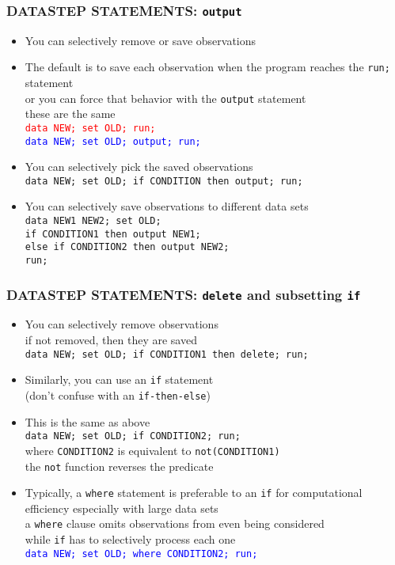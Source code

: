 \documentclass[11pt,pdftex,dvipsnames,usenames,helvetica]{beamer}
\begin{document}
\begin{frame}[fragile]
\frametitle{DATASTEP STATEMENTS: {\tt output}}
\begin{itemize}
\item You can selectively remove or save observations
\item The default is to save each observation when the program
reaches the {\tt run;} statement\\
or you can force that behavior with the {\tt output} statement\\
these are the same\\
\textcolor{red}{\tt data NEW; set OLD; run;}\\
\textcolor{blue}{\tt data NEW; set OLD; output; run;}
\item You can selectively pick the saved observations\\
{\tt data NEW; set OLD; if CONDITION then output; run;}
\item You can selectively save observations to different data sets\\
{\tt data NEW1 NEW2; set OLD;\\
 if CONDITION1 then output NEW1;\\
 else if CONDITION2 then output NEW2;\\
 run;}
\end{itemize}
\end{frame}

\begin{frame}[fragile]
\frametitle{DATASTEP STATEMENTS: {\tt delete} and subsetting {\tt if}}
\begin{itemize}
\item You can selectively remove observations\\
if not removed, then they are saved\\
{\tt data NEW; set OLD; if CONDITION1 then delete; run;}
\item Similarly, you can use an {\tt if} statement\\ 
(don't confuse with an {\tt if-then-else})
\item This is the same as above\\
{\tt data NEW; set OLD; if CONDITION2; run;}\\
where {\tt CONDITION2} is equivalent to {\tt not(CONDITION1)}\\
the {\tt not} function reverses the predicate
\item Typically, a {\tt where} statement is preferable to an {\tt if} for
computational efficiency especially with large data sets\\
a {\tt where} clause omits observations from even being considered\\
while {\tt if} has to selectively process each one\\
\textcolor{blue}{\tt data NEW; set OLD; where CONDITION2; run;}\\
\end{itemize}
\end{frame}
\end{document}
